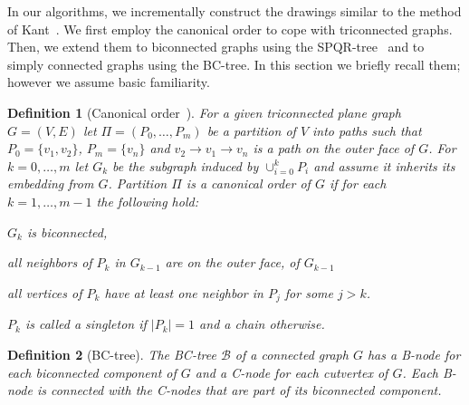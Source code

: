 \documentclass[a4paper,twoside,11pt]{article}
\newtheorem{definition}{Definition}
\begin{document}
In our algorithms, we incrementally construct the drawings similar
to the method of Kant~\cite{Kant92b}. We first employ the canonical
order to cope with triconnected graphs. Then, we extend them to
biconnected graphs using the SPQR-tree~\cite{BT90} and to simply connected
graphs using the BC-tree. In this section we briefly recall them;
however we assume basic familiarity.


\begin{definition}[Canonical order~\cite{Kant92b}]
For a given triconnected plane graph $G=(V,E)$ let $\Pi =
(P_0,\ldots,P_m)$ be a partition of $V$ into paths such that $P_0 =
\{v_1,v_2\}$, $P_m=\{v_n\}$ and $v_2 \rightarrow v_1 \rightarrow
v_n$ is a path on the outer face of $G$. For $k=0,\ldots,m$ let
$G_k$ be the subgraph induced by $\cup_{i=0}^k P_i$ and assume it 
inherits its embedding from $G$. Partition $\Pi$ is a canonical
order of $G$ if for each $k=1,\ldots,m-1$ the following hold:
\begin{inparaenum}[(i)]
\item $G_k$ is biconnected,
\item all neighbors of $P_k$ in $G_{k-1}$ are on the outer face,
of $G_{k-1}$
\item all vertices of $P_k$ have at least one neighbor in $P_j$
for some $j > k$.
\end{inparaenum}
$P_k$ is called a singleton if $|P_k|=1$ and a chain otherwise.
\end{definition}

\begin{definition}[BC-tree]
The \emph{BC-tree} $\mathcal{B}$ of a connected graph $G$ has a
B-node for each biconnected component of $G$ and a C-node for each
cutvertex of $G$. Each B-node is connected with the C-nodes that are
part of its biconnected component.
\end{definition}
\end{document}
